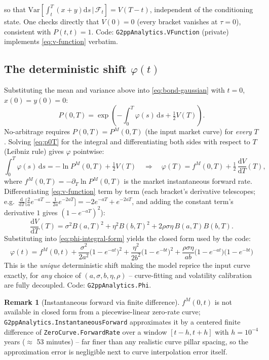 \documentclass[11pt,a4paper]{article}
\newcommand{\dd}{\mathrm{d}}
\newcommand{\F}{\mathcal{F}}
\newcommand{\Var}{\mathrm{Var}}
\newcommand{\coderef}[1]{\texttt{\color{blue!60!black}#1}}
\theoremstyle{definition}
\newtheorem{remark}{Remark}[section]
\begin{document}
so that $\Var[\int_t^T(x{+}y)\dd s\,|\,\F_t] = V(T-t)$, independent of the
conditioning state. One checks directly that $V(0)=0$ (every bracket
vanishes at $\tau=0$), consistent with $P(t,t)=1$. Code:
\coderef{G2ppAnalytics.VFunction} (private) implements \eqref{eq:v-function}
verbatim.

\subsection{The deterministic shift $\varphi(t)$}
\label{sec:phi-derivation}

Substituting the mean and variance above into \eqref{eq:bond-gaussian} with
$t=0$, $x(0)=y(0)=0$:
\begin{equation}
  P(0,T) = \exp\!\left(-\int_0^T\varphi(s)\,\dd s + \tfrac12 V(T)\right).
  \label{eq:p0T}
\end{equation}
No-arbitrage requires $P(0,T)=P^M(0,T)$ (the input market curve) for
\emph{every} $T$. Solving \eqref{eq:p0T} for the integral and differentiating
both sides with respect to $T$ (Leibniz rule) gives $\varphi$ pointwise:
\begin{equation}
  \int_0^T\varphi(s)\,\dd s = -\ln P^M(0,T) + \tfrac12 V(T)
  \quad\Longrightarrow\quad
  \varphi(T) = f^M(0,T) + \tfrac12\,\frac{\dd V}{\dd T}(T),
  \label{eq:phi-integral-form}
\end{equation}
where $f^M(0,T)=-\partial_T\ln P^M(0,T)$ is the market instantaneous forward
rate. Differentiating \eqref{eq:v-function} term by term (each bracket's
derivative telescopes; e.g.\ $\frac{\dd}{\dd T}\bigl[\tfrac{2}{a}e^{-aT}-\tfrac{1}{2a}e^{-2aT}\bigr] = -2e^{-aT}+e^{-2aT}$, and adding the constant term's derivative $1$ gives $(1-e^{-aT})^2$):
\[
  \frac{\dd V}{\dd T}(T) = \sigma^2 B(a,T)^2 + \eta^2 B(b,T)^2 + 2\rho\sigma\eta\,B(a,T)B(b,T).
\]
Substituting into \eqref{eq:phi-integral-form} yields the closed form used by
the code:
\begin{equation}
  \boxed{\;\varphi(t) = f^M(0,t)
   + \frac{\sigma^2}{2a^2}\bigl(1-e^{-at}\bigr)^2
   + \frac{\eta^2}{2b^2}\bigl(1-e^{-bt}\bigr)^2
   + \frac{\rho\sigma\eta}{ab}\bigl(1-e^{-at}\bigr)\bigl(1-e^{-bt}\bigr)\;}
  \label{eq:phi-final}
\end{equation}
This is the \emph{unique} deterministic shift making the model reprice the
input curve exactly, for \emph{any} choice of $(a,\sigma,b,\eta,\rho)$ --
curve-fitting and volatility calibration are fully decoupled. Code:
\coderef{G2ppAnalytics.Phi}.

\begin{remark}[Instantaneous forward via finite difference]
$f^M(0,t)$ is not available in closed form from a piecewise-linear
zero-rate curve; \coderef{G2ppAnalytics.InstantaneousForward} approximates it
by a centered finite difference of \coderef{ZeroCurve.ForwardRate} over a
window $[t-h,t+h]$ with $h=10^{-4}$ years ($\approx$ 53 minutes) -- far
finer than any realistic curve pillar spacing, so the approximation error is
negligible next to curve interpolation error itself.
\end{remark}
\end{document}
